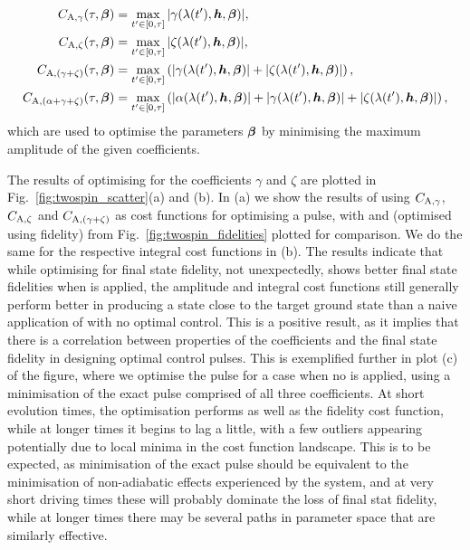 \begin{equation}\label{eq:twospin_costfunc_amp}
    \begin{aligned}
        C_{\rm A, \gamma}(\tau, \boldsymbol{\beta}) &= \max_{t^{\prime} \in [0,\tau]} | \gamma(\lambda(t^{\prime}), \boldsymbol{h}, \boldsymbol{\beta})|,\\
        C_{\rm A, \zeta}(\tau, \boldsymbol{\beta}) &= \max_{t^{\prime} \in [0,\tau]} | \zeta(\lambda(t^{\prime}), \boldsymbol{h}, \boldsymbol{\beta})|,\\
        C_{\rm A, (\gamma + \zeta)}(\tau, \boldsymbol{\beta}) &= \max_{t^{\prime} \in [0,\tau]} \left(| \gamma(\lambda(t^{\prime}), \boldsymbol{h}, \boldsymbol{\beta})| + |\zeta(\lambda(t^{\prime}), \boldsymbol{h}, \boldsymbol{\beta})| \right),\\
        C_{\rm A, (\alpha + \gamma + \zeta)}(\tau, \boldsymbol{\beta}) &= \max_{t^{\prime} \in [0,\tau]} \left(| \alpha(\lambda(t^{\prime}), \boldsymbol{h}, \boldsymbol{\beta})| + |\gamma(\lambda(t^{\prime}), \boldsymbol{h}, \boldsymbol{\beta})| + |\zeta(\lambda(t^{\prime}), \boldsymbol{h}, \boldsymbol{\beta})| \right),
    \end{aligned}
\end{equation}
which are used to optimise the parameters $\boldsymbol{\beta}$ by minimising the maximum amplitude of the given  coefficients.

The results of optimising for the   coefficients $\gamma$ and $\zeta$ are plotted in Fig.~\ref{fig:twospin_scatter}(a) and (b). In (a) we show the results of using $C_{\rm A, \gamma}$, $C_{\rm A, \zeta}$ and $C_{\rm A, (\gamma + \zeta)}$ as cost functions for optimising a   pulse, with   and   (optimised using fidelity) from Fig.~\ref{fig:twospin_fidelities} plotted for comparison. We do the same for the respective integral cost functions in (b). The results indicate that while optimising for final state fidelity, not unexpectedly, shows better final state fidelities when  is applied, the amplitude and integral cost functions still generally perform better in producing a state close to the target ground state than a naive application of   with no optimal control. This is a positive result, as it implies that there is a correlation between properties of the  coefficients and the final state fidelity in designing optimal control pulses. This is exemplified further in plot (c) of the figure, where we optimise the pulse for a case when no  is applied, using a minimisation of the exact  pulse comprised of all three  coefficients. At short evolution times, the optimisation performs as well as the fidelity cost function, while at longer times it begins to lag a little, with a few outliers appearing potentially due to local minima in the cost function landscape. This is to be expected, as minimisation of the exact  pulse should be equivalent to the minimisation of non-adiabatic effects experienced by the system, and at very short driving times these will probably dominate the loss of final stat fidelity, while at longer times there may be several paths in parameter space that are similarly effective. 

